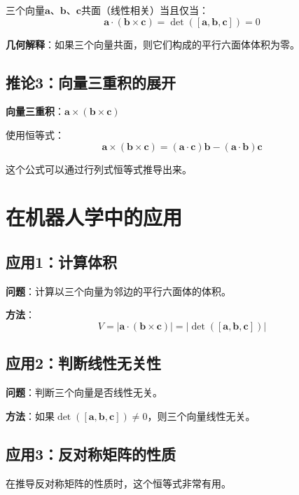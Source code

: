 \documentclass[12pt,a4paper]{article}
\begin{document}
三个向量$\bm{a}$、$\bm{b}$、$\bm{c}$共面（线性相关）当且仅当：
\begin{equation}
\bm{a} \cdot (\bm{b} \times \bm{c}) = \det([\bm{a}, \bm{b}, \bm{c}]) = 0
\end{equation}

\textbf{几何解释}：如果三个向量共面，则它们构成的平行六面体体积为零。

\subsection{推论3：向量三重积的展开}

\textbf{向量三重积}：$\bm{a} \times (\bm{b} \times \bm{c})$

使用恒等式：
\begin{equation}
\bm{a} \times (\bm{b} \times \bm{c}) = (\bm{a} \cdot \bm{c})\bm{b} - (\bm{a} \cdot \bm{b})\bm{c}
\end{equation}

这个公式可以通过行列式恒等式推导出来。

\section{在机器人学中的应用}

\subsection{应用1：计算体积}

\textbf{问题}：计算以三个向量为邻边的平行六面体的体积。

\textbf{方法}：
\begin{equation}
V = |\bm{a} \cdot (\bm{b} \times \bm{c})| = |\det([\bm{a}, \bm{b}, \bm{c}])|
\end{equation}

\subsection{应用2：判断线性无关性}

\textbf{问题}：判断三个向量是否线性无关。

\textbf{方法}：如果$\det([\bm{a}, \bm{b}, \bm{c}]) \neq 0$，则三个向量线性无关。

\subsection{应用3：反对称矩阵的性质}

在推导反对称矩阵的性质时，这个恒等式非常有用。
\end{document}
